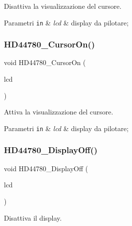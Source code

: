 Disattiva la visualizzazione del cursore. 


\begin{DoxyParams}[1]{Parametri}
\mbox{\tt in}  & {\em lcd} & display da pilotare; \\
\hline
\end{DoxyParams}
\mbox{\label{group___h_d44780_ga3a381cb44df5d76d79be5ed71a52bae6}} 
\subsubsection{\texorpdfstring{H\+D44780\+\_\+\+Cursor\+On()}{HD44780\_CursorOn()}}
{\footnotesize\ttfamily void H\+D44780\+\_\+\+Cursor\+On (\begin{DoxyParamCaption}\item[{\hyperlink{struct_h_d44780___l_c_d__t}{H\+D44780\+\_\+\+L\+C\+D\+\_\+t} $\ast$}]{lcd }\end{DoxyParamCaption})}



Attiva la visualizzazione del cursore. 


\begin{DoxyParams}[1]{Parametri}
\mbox{\tt in}  & {\em lcd} & display da pilotare; \\
\hline
\end{DoxyParams}
\mbox{\label{group___h_d44780_ga5cf07b2179272029410f9a81f56621ed}} 
\subsubsection{\texorpdfstring{H\+D44780\+\_\+\+Display\+Off()}{HD44780\_DisplayOff()}}
{\footnotesize\ttfamily void H\+D44780\+\_\+\+Display\+Off (\begin{DoxyParamCaption}\item[{\hyperlink{struct_h_d44780___l_c_d__t}{H\+D44780\+\_\+\+L\+C\+D\+\_\+t} $\ast$}]{lcd }\end{DoxyParamCaption})}



Disattiva il display. 


